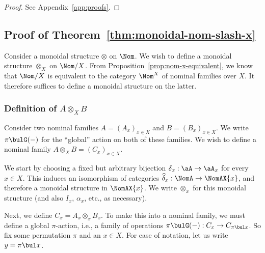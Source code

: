 \documentclass[twoside,11pt]{entics}
\begin{document}
\begin{proof}
  See Appendix~\ref{app:proofs}.
\end{proof}

\subsection{Proof of Theorem~\ref{thm:monoidal-nom-slash-x}}

Consider a monoidal structure $\otimes$ on $\Nom$. We wish to define a
monoidal structure $\otimes_X$ on $\Nom/X$. From
Proposition~\ref{prop:nom-x-equivalent}, we know that $\Nom/X$ is
equivalent to the category $\Nom^X$ of nominal families over $X$.
It therefore suffices to define a monoidal structure on the latter.

\subsubsection{Definition of $A\otimes_X B$}\label{sssec:def-a-times-b}

Consider two nominal families $A = (A_x)_{x\in X}$ and $B =
(B_x)_{x\in X}$. We write $\pi\bulG(-)$ for the ``global'' action
on both of these families. We wish to define a nominal family
$A\otimes_X B = (C_x)_{x\in X}$.

We start by choosing a fixed but arbitrary bijection $\delta_x :
\aA\to\aA_{x}$ for every $x\in X$. This induces an isomorphism of
categories $\widehat\delta_x:\NomA\to\NomAX{x}$, and therefore a
monoidal structure in $\NomAX{x}$. We write $\otimes_x$ for this
monoidal structure (and also $I_x$, $\alpha_x$, etc., as necessary).

Next, we define $C_x = A_x\otimes_x B_x$. To make this into a nominal
family, we must define a global $\pi$-action, i.e., a family of
operations $\pi\bulG(-) : C_x \to C_{\pi\bul x}$. So fix some
permutation $\pi$ and an $x\in X$. For ease of notation, let us write
$y=\pi\bul x$.
\end{document}
